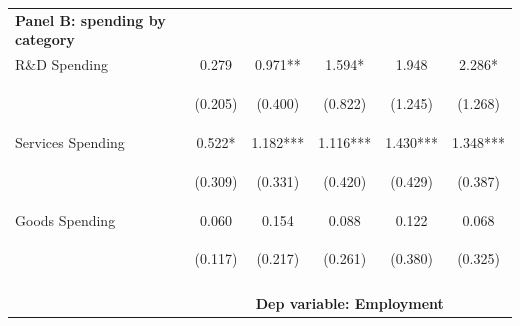 \documentclass[dv_diss_main.tex]{subfiles}
\begin{document}
\begin{table}[H]
\begin{center}
{\begin{tabular}{lccccc}
   \multicolumn{1}{l}{\textbf{Panel B: spending by category}} & & & & \\ 
    R\&D Spending & 0.279 & 0.971** & 1.594* & 1.948 & 2.286* \\
    \vspace{4pt} & \begin{footnotesize}(0.205)\end{footnotesize} & \begin{footnotesize}(0.400)\end{footnotesize} & \begin{footnotesize}(0.822)\end{footnotesize} & \begin{footnotesize}(1.245)\end{footnotesize} & \begin{footnotesize}(1.268)\end{footnotesize} \\
    Services Spending & 0.522* & 1.182*** & 1.116*** & 1.430*** & 1.348*** \\
    \vspace{4pt} & \begin{footnotesize}(0.309)\end{footnotesize} & \begin{footnotesize}(0.331)\end{footnotesize} & \begin{footnotesize}(0.420)\end{footnotesize} & \begin{footnotesize}(0.429)\end{footnotesize} & \begin{footnotesize}(0.387)\end{footnotesize} \\
    Goods Spending & 0.060 & 0.154 & 0.088 & 0.122 & 0.068 \\
     & \begin{footnotesize}(0.117)\end{footnotesize} & \begin{footnotesize}(0.217)\end{footnotesize} & \begin{footnotesize}(0.261)\end{footnotesize} & \begin{footnotesize}(0.380)\end{footnotesize} & \begin{footnotesize}(0.325)\end{footnotesize} \\
     \vspace{-2pt} & \vspace{-2pt} & \vspace{-2pt} & \vspace{-2pt} & \vspace{-2pt} \\
     \hline 
     & \multicolumn{5}{c}{\textbf{Dep variable: Employment}} \\ 
    \cmidrule{2-6}
    

\end{tabular}}
\end{center}
\end{table}
\end{document}
